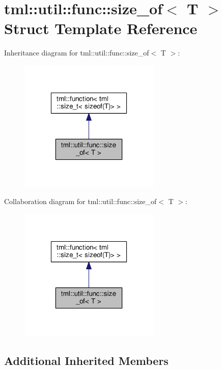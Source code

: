 \hypertarget{structtml_1_1util_1_1func_1_1size__of}{\section{tml\+:\+:util\+:\+:func\+:\+:size\+\_\+of$<$ T $>$ Struct Template Reference}
\label{structtml_1_1util_1_1func_1_1size__of}
}


Inheritance diagram for tml\+:\+:util\+:\+:func\+:\+:size\+\_\+of$<$ T $>$\+:
\nopagebreak
\begin{figure}[H]
\begin{center}
\leavevmode
\includegraphics[width=190pt]{structtml_1_1util_1_1func_1_1size__of__inherit__graph}
\end{center}
\end{figure}


Collaboration diagram for tml\+:\+:util\+:\+:func\+:\+:size\+\_\+of$<$ T $>$\+:
\nopagebreak
\begin{figure}[H]
\begin{center}
\leavevmode
\includegraphics[width=190pt]{structtml_1_1util_1_1func_1_1size__of__coll__graph}
\end{center}
\end{figure}
\subsection*{Additional Inherited Members}


